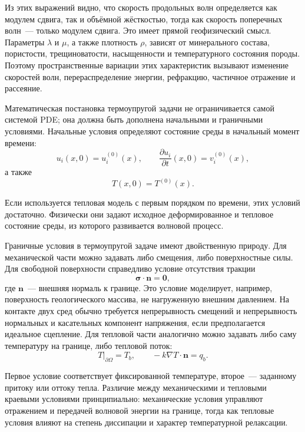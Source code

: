 Из этих выражений видно, что скорость продольных волн определяется как модулем сдвига, так и объёмной жёсткостью, тогда как скорость поперечных волн~--- только модулем сдвига. Это имеет прямой геофизический смысл. Параметры $\lambda$ и $\mu$, а также плотность $\rho$, зависят от минерального состава, пористости, трещиноватости, насыщенности и температурного состояния породы. Поэтому пространственные вариации этих характеристик вызывают изменение скоростей волн, перераспределение энергии, рефракцию, частичное отражение и рассеяние.

Математическая постановка термоупругой задачи не ограничивается самой системой PDE; она должна быть дополнена начальными и граничными условиями. Начальные условия определяют состояние среды в начальный момент времени:
\begin{equation}
u_i(x,0)=u_i^{(0)}(x),\qquad
\frac{\partial u_i}{\partial t}(x,0)=v_i^{(0)}(x),
\end{equation}
а также
\begin{equation}
T(x,0)=T^{(0)}(x).
\end{equation}

Если используется тепловая модель с первым порядком по времени, этих условий достаточно. Физически они задают исходное деформированное и тепловое состояние среды, из которого развивается волновой процесс.

Граничные условия в термоупругой задаче имеют двойственную природу. Для механической части можно задавать либо смещения, либо поверхностные силы. Для свободной поверхности справедливо условие отсутствия тракции
\begin{equation}
\boldsymbol{\sigma}\cdot \mathbf{n}=\mathbf{0},
\end{equation}
где $\mathbf{n}$~--- внешняя нормаль к границе. Это условие моделирует, например, поверхность геологического массива, не нагруженную внешним давлением. На контакте двух сред обычно требуется непрерывность смещений и непрерывность нормальных и касательных компонент напряжения, если предполагается идеальное сцепление. Для тепловой части аналогично можно задавать либо саму температуру на границе, либо тепловой поток:
\begin{equation}
T|_{\partial\Omega}=T_b,\qquad
-k\nabla T\cdot \mathbf{n}=q_b.
\end{equation}

Первое условие соответствует фиксированной температуре, второе~--- заданному притоку или оттоку тепла. Различие между механическими и тепловыми краевыми условиями принципиально: механические условия управляют отражением и передачей волновой энергии на границе, тогда как тепловые условия влияют на степень диссипации и характер температурной релаксации.


